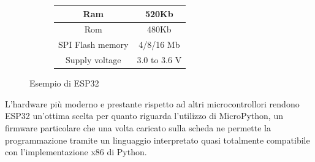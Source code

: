 \begin{figure}[H]
\begin{subfigure}{0.49\textwidth}
\begin{tabular}{|c|c|}
            \hline
            Ram                      & 520Kb        \\
            \hline
            Rom                      & 480Kb        \\
            \hline
            SPI Flash memory         & 4/8/16 Mb    \\
            \hline
            Supply voltage           & 3.0 to 3.6 V \\
            \hline
        \end{tabular}
    \end{subfigure}
    \caption{Esempio di ESP32}
\end{figure}

L'hardware più moderno e prestante rispetto ad altri microcontrollori rendono
ESP32 un'ottima scelta per quanto riguarda l'utilizzo di MicroPython, un
firmware particolare che una volta caricato sulla scheda ne permette la
programmazione tramite un linguaggio interpretato quasi totalmente compatibile
con l'implementazione x86 di Python.